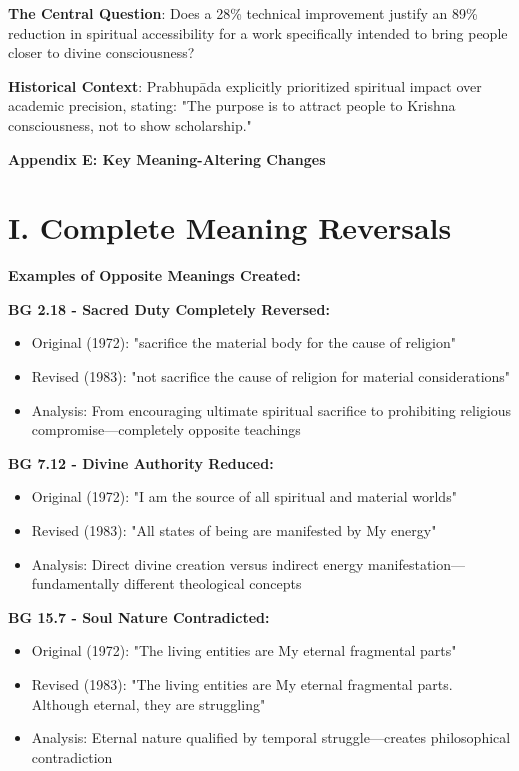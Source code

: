 \documentclass[11pt,twoside]{book}
\begin{document}
\textbf{\textbf{The Central Question}}: Does a 28\% technical improvement justify an 89\% reduction in spiritual accessibility for a work specifically intended to bring people closer to divine consciousness?

\textbf{\textbf{Historical Context}}: Prabhupāda explicitly prioritized spiritual impact over academic precision, stating: "The purpose is to attract people to Krishna consciousness, not to show scholarship."

\clearpage
\pagestyle{sectionopening}
\thispagestyle{sectionopening}
\markboth{}{}
\markright{}
\vspace*{0.25\textheight}
\begin{center}
{\Huge\bfseries Appendix E: Key Meaning-Altering Changes}
\end{center}
\newpage
\section*{I. Complete Meaning Reversals}
\label{sec:org8eab787}

\textbf{\textbf{Examples of Opposite Meanings Created:}}

\textbf{\textbf{BG 2.18 - Sacred Duty Completely Reversed:}}
\begin{itemize}
\item Original (1972): "sacrifice the material body for the cause of religion"
\item Revised (1983): "not sacrifice the cause of religion for material considerations"
\item Analysis: From encouraging ultimate spiritual sacrifice to prohibiting religious 
compromise—completely opposite teachings
\end{itemize}

\textbf{\textbf{BG 7.12 - Divine Authority Reduced:}}
\begin{itemize}
\item Original (1972): "I am the source of all spiritual and material worlds"
\item Revised (1983): "All states of being are manifested by My energy"
\item Analysis: Direct divine creation versus indirect energy 
manifestation—fundamentally different theological concepts
\end{itemize}

\textbf{\textbf{BG 15.7 - Soul Nature Contradicted:}}
\begin{itemize}
\item Original (1972): "The living entities are My eternal fragmental parts"
\item Revised (1983): "The living entities are My eternal fragmental parts. Although eternal, they are struggling"
\item Analysis: Eternal nature qualified by temporal struggle—creates philosophical 
contradiction
\end{itemize}
\end{document}
